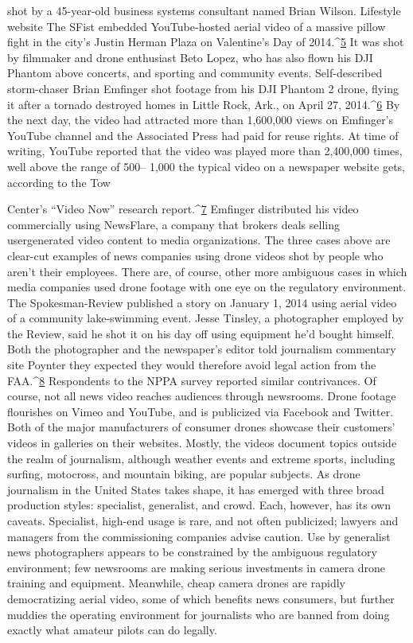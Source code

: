 shot by a 45-year-old business systems consultant named Brian Wilson.
Lifestyle website The SFist embedded YouTube-hosted aerial video of a
massive pillow fight in the city's Justin Herman Plaza on Valentine's Day of
2014.^{\href{#endnotes-industry-overview}{5}} It was shot by filmmaker and drone enthusiast Beto Lopez, who has
also flown his DJI Phantom above concerts, and sporting and community
events.
Self-described storm-chaser Brian Emfinger shot footage from his DJI
Phantom 2 drone, flying it after a tornado destroyed homes in Little Rock,
Ark., on April 27, 2014.^{\href{#endnotes-industry-overview}{6}} By the next day, the video had attracted more than
1,600,000 views on Emfinger's YouTube channel and the Associated Press
had paid for reuse rights. At time of writing, YouTube reported that the
video was played more than 2,400,000 times, well above the range of 500–
1,000 the typical video on a newspaper website gets, according to the Tow

Center's ``Video Now'' research report.^{\href{#endnotes-industry-overview}{7}} Emfinger distributed his video
commercially using NewsFlare, a company that brokers deals selling usergenerated
video content to media organizations.
The three cases above are clear-cut examples of news companies using drone
videos shot by people who aren't their employees. There are, of course, other
more ambiguous cases in which media companies used drone footage with
one eye on the regulatory environment. The Spokesman-Review published a
story on January 1, 2014 using aerial video of a community lake-swimming
event. Jesse Tinsley, a photographer employed by the Review, said he shot it
on his day off using equipment he'd bought himself. Both the photographer
and the newspaper's editor told journalism commentary site Poynter they
expected they would therefore avoid legal action from the FAA.^{\href{#endnotes-industry-overview}{8}} Respondents
to the NPPA survey reported similar contrivances.
Of course, not all news video reaches audiences through newsrooms. Drone
footage flourishes on Vimeo and YouTube, and is publicized via Facebook
and Twitter. Both of the major manufacturers of consumer drones showcase
their customers' videos in galleries on their websites. Mostly, the videos
document topics outside the realm of journalism, although weather
events and extreme sports, including surfing, motocross, and mountain
biking, are popular subjects.
As drone journalism in the United States takes shape, it has emerged with
three broad production styles: specialist, generalist, and crowd. Each,
however, has its own caveats. Specialist, high-end usage is rare, and not
often publicized; lawyers and managers from the commissioning companies
advise caution. Use by generalist news photographers appears to be
constrained by the ambiguous regulatory environment; few newsrooms are making serious investments in camera drone training and equipment.
Meanwhile, cheap camera drones are rapidly democratizing aerial video,
some of which benefits news consumers, but further muddies the operating
environment for journalists who are banned from doing exactly what amateur
pilots can do legally.

